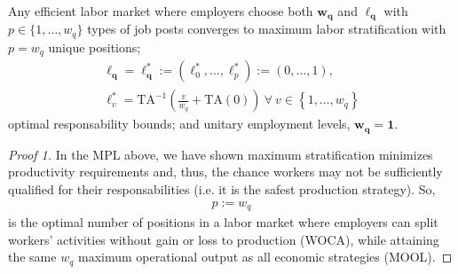 \documentclass[hidelinks, nonatbib]{elsarticle}
\begin{document}
\begin{lemma}
    Any efficient labor market where employers choose both $\boldsymbol{w_q}$ and $\boldsymbol{\ell_q}$ with $p \in \{1, \dots, w_q\}$ types of job posts converges to maximum labor stratification with
    $
    p = w_q
    $
    unique positions;
    \begin{gather}
    \boldsymbol{\ell_q} = 
    \boldsymbol{\ell_{q}^{*}}
    :=
    (
        \ell_{0}^{*}
        ,
        \dots
        ,
        \ell_{p}^{*}
    )
    :=
    (
        0
        ,
        \dots
        ,
        1
    )
    ,
    \\
    \ell_{v}^{*}
    =
    \text{TA}^{-1}\left(
        \frac{v}{w_q}
        +
        \text{TA}(0)
    \right)
    \
    \forall
    \
    v \in 
    \left\{
        1, \dots, w_q
    \right\}
    \end{gather}
    optimal responsability bounds; and unitary employment levels,
    $
    \boldsymbol{w_q} =
    \boldsymbol{1}
    .
    $
    
    \begin{proof}[Proof 1]
        In the MPL above, we have shown maximum stratification minimizes productivity requirements and, thus, the chance workers may not be sufficiently qualified for their responsabilities (i.e. it is the safest production strategy). So, 
        \begin{gather}
            p := w_q
        \end{gather}
        is the optimal number of positions in a labor market where employers can split workers' activities without gain or loss to production (WOCA), while attaining the same $w_q$ maximum operational output as all economic strategies (MOOL).
        

\end{proof}
\end{lemma}
\end{document}
